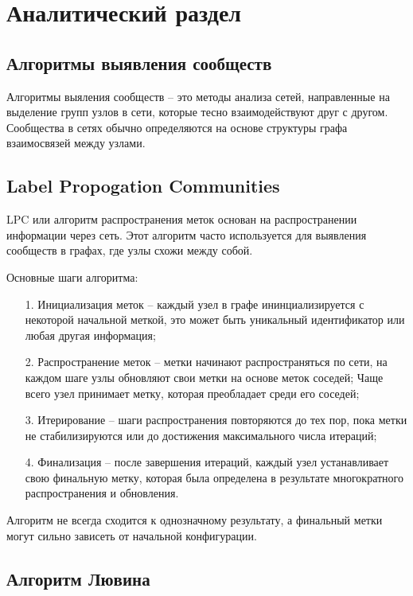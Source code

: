 \section{Аналитический раздел}

\subsection{Алгоритмы выявления сообществ}

Алгоритмы выяления сообществ -- это методы анализа сетей, направленные на выделение групп узлов в сети, которые тесно взаимодействуют друг с другом. Сообщества в сетях обычно определяются на основе структуры графа взаимосвязей между узлами.

\subsection{Label Propogation Communities}

LPC или алгоритм распространения меток основан на распространении информации через сеть. Этот алгоритм часто используется для выявления сообществ в графах, где узлы схожи между собой.

Основные шаги алгоритма:

\begin{enumerate}
	\item[1.] Инициализация меток -- каждый узел в графе ининциализируется с некоторой начальной меткой, это может быть уникальный идентификатор или любая другая информация;
	\item[2.] Распространение меток -- метки начинают распространяться по сети, на каждом шаге узлы обновляют свои метки на основе меток соседей; Чаще всего узел принимает метку, которая преобладает среди его соседей;
	\item[3.] Итерирование -- шаги распространения повторяются до тех пор, пока метки не стабилизируются или до достижения максимального числа итераций;
	\item[4.] Финализация -- после завершения итераций, каждый узел устанавливает свою финальную метку, которая была определена в результате многократного распространения и обновления.
\end{enumerate}

Алгоритм не всегда сходится к однозначному результату, а финальный метки могут сильно зависеть от начальной конфигурации.

\subsection{Алгоритм Лювина}

